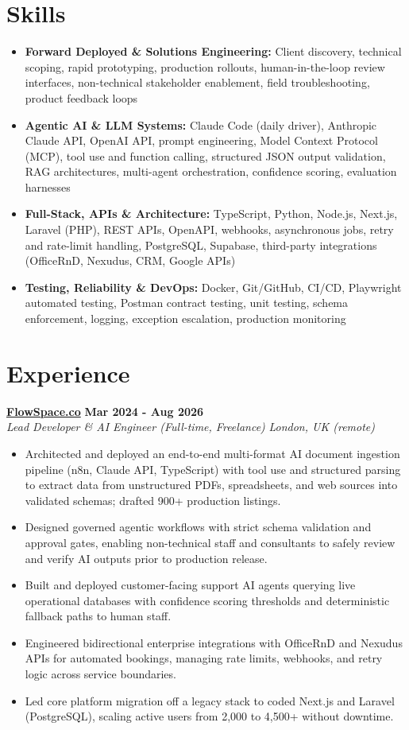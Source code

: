 \documentclass[a4paper,10pt]{article}
\newcommand{\role}[4]{%
  \textbf{#1} \hfill \textbf{#2}\\[1pt]%
  \textit{#3} \hfill \textit{#4}\\[2pt]%
}
\begin{document}
\section{Skills}
\begin{itemize}
  \item \textbf{Forward Deployed \& Solutions Engineering:} Client discovery, technical scoping, rapid prototyping, production rollouts, human-in-the-loop review interfaces, non-technical stakeholder enablement, field troubleshooting, product feedback loops
  \item \textbf{Agentic AI \& LLM Systems:} Claude Code (daily driver), Anthropic Claude API, OpenAI API, prompt engineering, Model Context Protocol (MCP), tool use and function calling, structured JSON output validation, RAG architectures, multi-agent orchestration, confidence scoring, evaluation harnesses
  \item \textbf{Full-Stack, APIs \& Architecture:} TypeScript, Python, Node.js, Next.js, Laravel (PHP), REST APIs, OpenAPI, webhooks, asynchronous jobs, retry and rate-limit handling, PostgreSQL, Supabase, third-party integrations (OfficeRnD, Nexudus, CRM, Google APIs)
  \item \textbf{Testing, Reliability \& DevOps:} Docker, Git/GitHub, CI/CD, Playwright automated testing, Postman contract testing, unit testing, schema enforcement, logging, exception escalation, production monitoring
\end{itemize}

\section{Experience}

\role{\href{https://flowspace.co}{FlowSpace.co}}{Mar 2024 - Aug 2026}{Lead Developer \& AI Engineer (Full-time, Freelance)}{London, UK (remote)}
\begin{itemize}
  \item Architected and deployed an end-to-end multi-format AI document ingestion pipeline (n8n, Claude API, TypeScript) with tool use and structured parsing to extract data from unstructured PDFs, spreadsheets, and web sources into validated schemas; drafted 900+ production listings.
  \item Designed governed agentic workflows with strict schema validation and approval gates, enabling non-technical staff and consultants to safely review and verify AI outputs prior to production release.
  \item Built and deployed customer-facing support AI agents querying live operational databases with confidence scoring thresholds and deterministic fallback paths to human staff.
  \item Engineered bidirectional enterprise integrations with OfficeRnD and Nexudus APIs for automated bookings, managing rate limits, webhooks, and retry logic across service boundaries.
  \item Led core platform migration off a legacy stack to coded Next.js and Laravel (PostgreSQL), scaling active users from 2,000 to 4,500+ without downtime.
\end{itemize}
\end{document}
